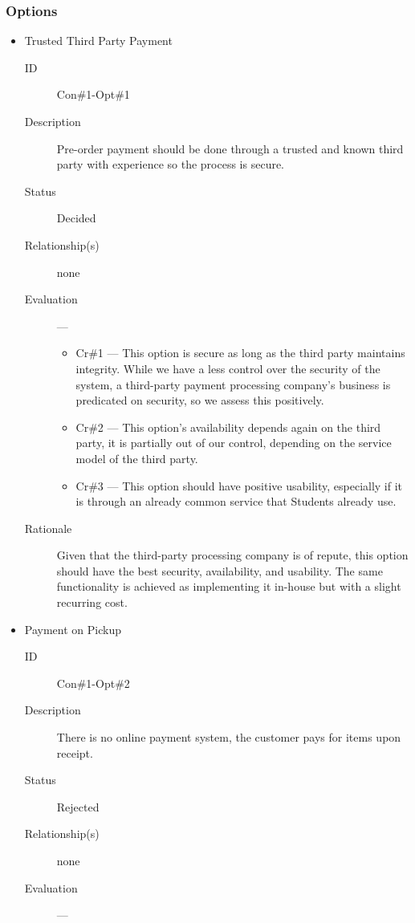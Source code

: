 \documentclass[11pt]{article}
\begin{document}
\subsubsection*{Options}
\label{sec:orge620475}
\begin{itemize}
\item Trusted Third Party Payment
\label{sec:org359e227}
\begin{description}
\item[{ID}] Con\#1-Opt\#1
\item[{Description}] Pre-order payment should be done through a
trusted and known third party with experience so
the process is secure.
\item[{Status}] Decided
\item[{Relationship(s)}] none
\item[{Evaluation}] ---
\begin{itemize}
\item Cr\#1 --- This option is secure as long as the third party
maintains integrity. While we have a less control over the
security of the system, a third-party payment processing
company's business is predicated on security, so we assess
this positively.
\item Cr\#2 --- This option's availability depends again on the
third party, it is partially out of our control, depending on
the service model of the third party.
\item Cr\#3 --- This option should have positive usability,
especially if it is through an already common service that
Students already use.
\end{itemize}
\item[{Rationale}] Given that the third-party processing company is
of repute, this option should have the best
security, availability, and usability. The same
functionality is achieved as implementing it
in-house but with a slight recurring cost.
\end{description}
\item Payment on Pickup
\label{sec:orgbd63207}
\begin{description}
\item[{ID}] Con\#1-Opt\#2
\item[{Description}] There is no online payment system, the customer
pays for items upon receipt.
\item[{Status}] Rejected
\item[{Relationship(s)}] none
\item[{Evaluation}] ---
\begin{itemize}

\end{itemize}
\end{description}
\end{itemize}
\end{document}
